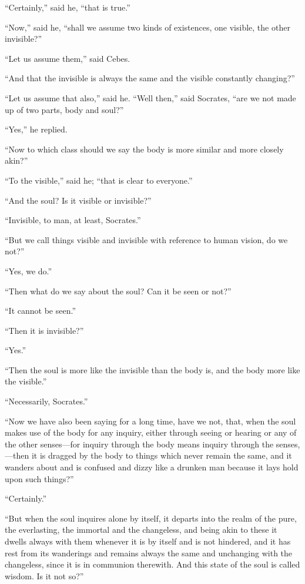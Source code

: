 \documentclass[letterpaper,12pt]{article}
\newcommand{\stephpag}[1]{\marginnote{\small\itshape\fontfamily{ppl}\selectfont #1}}
\begin{document}
\begin{drama}
``Certainly,'' said he, ``that is true.''
 
``Now,'' said he, ``shall we assume two kinds of existences, one visible, the other invisible?''
 
``Let us assume them,'' said Cebes.
 
``And that the invisible is always the same and the visible constantly changing?''
 
``Let us assume that also,'' said he. \stephpag{b} ``Well then,'' said Socrates, ``are we not made up of two parts, body and soul?''
 
``Yes,'' he replied.
 
``Now to which class should we say the body is more similar and more closely akin?''
 
``To the visible,'' said he; ``that is clear to everyone.''
 
``And the soul? Is it visible or invisible?''
 
``Invisible, to man, at least, Socrates.''
 
``But we call things visible and invisible with reference to human vision, do we not?''
 
``Yes, we do.''
 
``Then what do we say about the soul? Can it be seen or not?''
 
``It cannot be seen.''
 
``Then it is invisible?''
 
``Yes.''
 
``Then the soul is more like the invisible than the body is, \stephpag{c} and the body more like the visible.''
 
``Necessarily, Socrates.''
 
``Now we have also been saying for a long time, have we not, that, when the soul makes use of the body for any inquiry, either through seeing or hearing or any of the other senses---for inquiry through the body means inquiry through the senses,---then it is dragged by the body to things which never remain the same, and it wanders about and is confused and dizzy like a drunken man because it lays hold upon such things?''
 
``Certainly.''
 
``But when the soul \stephpag{d} inquires alone by itself, it departs into the realm of the pure, the everlasting, the immortal and the changeless, and being akin to these it dwells always with them whenever it is by itself and is not hindered, and it has rest from its wanderings and remains always the same and unchanging with the changeless, since it is in communion therewith. And this state of the soul is called wisdom. Is it not so?''
 

\end{drama}
\end{document}
